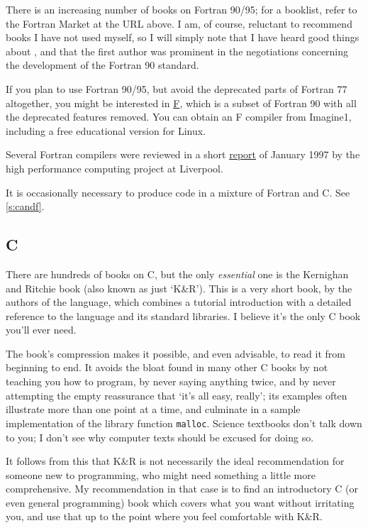 \documentclass[11pt,oneside,chapters]{starlink}
\begin{document}
There is an increasing number of books on Fortran 90/95;
for a booklist, refer to the Fortran Market at the URL
above.  I am, of course, reluctant to recommend books I
have not used myself, so I will simply note that I have
heard good things about \citet{metcalf96},
and that the first author was prominent in the
negotiations concerning the development of the Fortran 90
standard.

If you plan to use Fortran 90/95, but avoid the
deprecated parts of Fortran 77 altogether, you might be
interested in \href{http://www.swcp.com/~walt/imagine1/}{F},
which is a subset of Fortran 90 with all the deprecated
features removed.  You can obtain an F compiler from
Imagine1, including a free educational version for
Linux.

Several Fortran compilers were reviewed in a short
\href{http://www.liv.ac.uk/HPC/FortranCompilerStudyHTML/FortranCompilerStudyHTML.html}{report}
of January 1997 by the high performance computing project
at Liverpool.

It is occasionally necessary to produce code in a mixture
of Fortran and C.  See \ref{s:candf}.

\subsection{C}
\label{s:c}

There are hundreds of books on C, but the only
\emph{essential} one is the Kernighan and Ritchie book
\citep{kr} (also known as just `K\&R').
This is a very short book, by the authors of the language,
which combines a tutorial introduction with a detailed
reference to the language and its standard libraries.  I
believe it's the only C book you'll ever need.

The book's compression makes it possible, and even
advisable, to read it from beginning to end.  It avoids
the bloat found in many other C books by not teaching you
how to program, by never saying anything twice, and by
never attempting the empty reassurance that `it's all
easy, really'; its examples often illustrate more than one
point at a time, and culminate in a sample implementation
of the library function \texttt{malloc}.  Science
textbooks don't talk down to you; I don't see why computer
texts should be excused for doing so.

It follows from this that K\&R is not necessarily the
ideal recommendation for someone new to programming, who
might need something a little more comprehensive.  My
recommendation in that case is to find an introductory C
(or even general programming) book which covers what you
want without irritating you, and use that up to the point
where you feel comfortable with K\&R.
\end{document}
